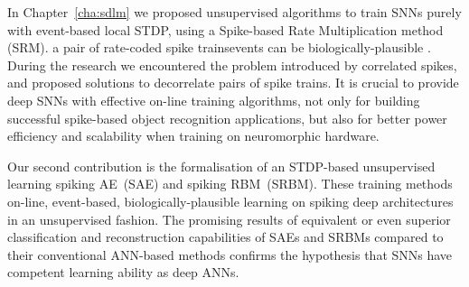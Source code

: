 In Chapter~\ref{cha:sdlm} we proposed unsupervised \DIFdelbegin {}\DIFdelend \DIFaddbegin {}\DIFaddend algorithms to train SNNs purely with event-based local STDP, using a Spike-based Rate Multiplication method \DIFdelbegin \DIFdel{~}\DIFdelend (SRM).
\DIFdelbegin {}\DIFdelend \DIFaddbegin {}\DIFaddend a pair of rate-coded spike trains\DIFdelbegin {}\DIFdelend \DIFaddbegin {}\DIFaddend events can be \DIFdelbegin {}\DIFdelend \DIFaddbegin {}\DIFaddend biologically-plausible \DIFdelbegin {}\DIFdelend \DIFaddbegin {}\DIFaddend .
During the research we encountered the problem introduced by correlated spikes, and proposed solutions to decorrelate pairs of spike trains.
It is crucial to provide deep SNNs with effective on-line training algorithms, not only for building successful spike-based object recognition applications, but also for better power efficiency and scalability when training on neuromorphic hardware.

Our second contribution is the formalisation of an STDP-based unsupervised learning \DIFdelbegin {}\DIFdelend \DIFaddbegin {}\DIFaddend spiking AE~(SAE) and spiking RBM~(SRBM).
These training methods \DIFdelbegin {}\DIFdelend \DIFaddbegin {}\DIFaddend on-line, event-based, biologically-plausible learning on spiking deep architectures in an unsupervised fashion.
The promising results of equivalent or even superior classification and reconstruction capabilities of SAEs and SRBMs compared to their conventional ANN-based methods confirms the hypothesis that SNNs have competent learning ability as deep ANNs.

\DIFaddbegin 

